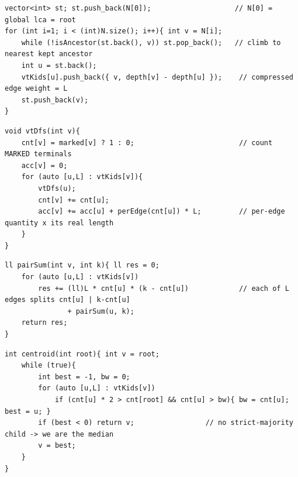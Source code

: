 \begin{lstlisting}[caption={Drill 2 -- the monotone-stack link (from lst:c30-build)}]
vector<int> st; st.push_back(N[0]);                    // N[0] = global lca = root
for (int i=1; i < (int)N.size(); i++){ int v = N[i];
    while (!isAncestor(st.back(), v)) st.pop_back();   // climb to nearest kept ancestor
    int u = st.back();
    vtKids[u].push_back({ v, depth[v] - depth[u] });    // compressed edge weight = L
    st.push_back(v);
}
\end{lstlisting}

\begin{lstlisting}[caption={Drill 3 -- the weighted fold (from lst:c30-fold)}]
void vtDfs(int v){
    cnt[v] = marked[v] ? 1 : 0;                         // count MARKED terminals
    acc[v] = 0;
    for (auto [u,L] : vtKids[v]){
        vtDfs(u);
        cnt[v] += cnt[u];
        acc[v] += acc[u] + perEdge(cnt[u]) * L;         // per-edge quantity x its real length
    }
}
\end{lstlisting}

\begin{lstlisting}[caption={Drill 4 -- pairwise distance sum over a set (from lst:c30-pairsum)}]
ll pairSum(int v, int k){ ll res = 0;
    for (auto [u,L] : vtKids[v])
        res += (ll)L * cnt[u] * (k - cnt[u])            // each of L edges splits cnt[u] | k-cnt[u]
               + pairSum(u, k);
    return res;
}
\end{lstlisting}

\begin{lstlisting}[caption={Drill 5 -- weighted-centroid / 1-median descent (from lst:c30-summit)}]
int centroid(int root){ int v = root;
    while (true){
        int best = -1, bw = 0;
        for (auto [u,L] : vtKids[v])
            if (cnt[u] * 2 > cnt[root] && cnt[u] > bw){ bw = cnt[u]; best = u; }
        if (best < 0) return v;                 // no strict-majority child -> we are the median
        v = best;
    }
}
\end{lstlisting}

